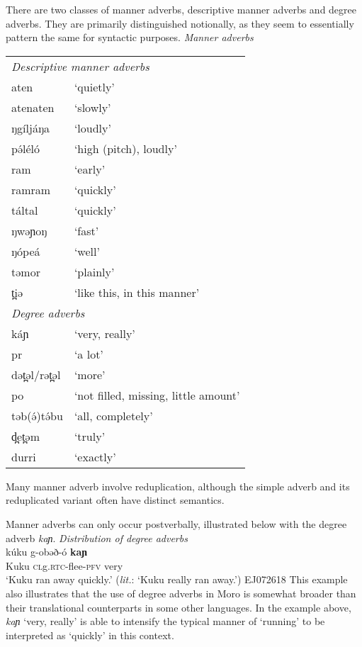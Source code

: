 There are two classes of manner adverbs, descriptive manner adverbs and degree adverbs. They are primarily distinguished notionally, as they seem to essentially pattern the same for syntactic purposes.
\ea \textit{Manner adverbs}\\
\begin{tabular}[t]{ll}
\multicolumn{2}{l}{\textit{Descriptive manner adverbs}} \\
aten		&	‘quietly’\\
atenaten	&	‘slowly’\\
ŋgíljáŋa	&	‘loudly’\\
pə́léló		&	‘high (pitch), loudly’\\
ram			&	‘early’\\
ramram		&	‘quickly’\\
táltal		&	‘quickly’\\
ŋwəɲoŋ		&	‘fast’\\
ŋópeá		&	‘well’\\	
təmor		&	`plainly' \\
t̪iə			&	‘like this, in this manner’\\
\multicolumn{2}{l}{\textit{Degree adverbs}} \\
káɲ			&	‘very, really’\\
pr			&	‘a lot’\\
dət̪əl/rət̪əl	&	‘more’\\
po			&	‘not filled, missing, little amount’\\
təb(ə́)tə́bu	&	‘all, completely'\\
d̪et̪əm		&	‘truly’\\
durri		&	‘exactly’\\
\end{tabular}
\z 
Many manner adverb involve reduplication, although the simple adverb and its reduplicated variant often have distinct semantics.  

Manner adverbs can only occur postverbally, illustrated below with the degree adverb \textit{kaɲ}. 
\ea \textit{Distribution of degree adverbs}\\ \label{ex:ch13:degree}
	\ea \gll kúku g-obəð-ó \textbf{kaɲ}\\
			Kuku \textsc{cl}g.\textsc{rtc}-flee-\textsc{pfv} very\\
		\glt `Kuku ran away quickly.' (\textit{lit.}: `Kuku really ran away.') \hfill EJ072618
	\z 
\z 
This example also illustrates that the use of degree adverbs in Moro is somewhat broader than their translational counterparts in some other languages. In the example above, \textit{kaɲ} `very, really' is able to intensify the typical manner of `running' to be interpreted as `quickly' in this context.


